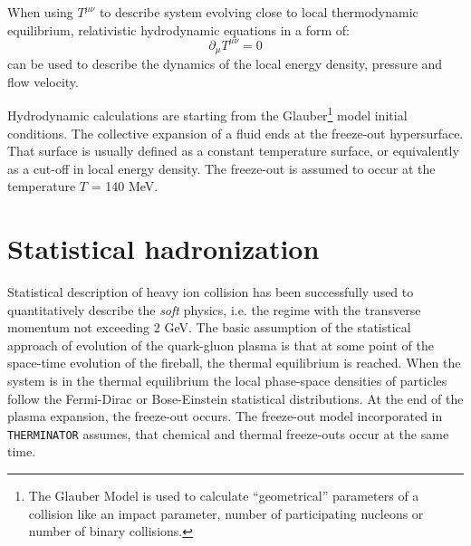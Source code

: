   When using $T^{\mu\nu}$ to describe system evolving close to local thermodynamic equilibrium, relativistic hydrodynamic equations in a form of:
  \begin{equation}
    \partial_{\mu} T^{\mu\nu} = 0
  \end{equation}
  can be used to describe the dynamics of the local energy density, pressure and flow velocity.

  Hydrodynamic calculations are starting from the Glauber\footnote{The Glauber Model is used to calculate ``geometrical'' parameters of a collision like an impact parameter, number of participating nucleons or number of binary collisions.}
  model initial conditions.
  The collective expansion of a fluid ends at the freeze-out hypersurface.
  That surface is usually defined as a constant temperature surface, or equivalently as a cut-off in local energy density.
  The freeze-out is assumed to occur at the temperature $T$ = 140 MeV.

  \section{Statistical hadronization}
    Statistical description of heavy ion collision has been successfully used to quantitatively describe the \textit{soft} physics, i.e. the regime with the transverse momentum not exceeding 2 GeV.
    The basic assumption of the statistical approach of evolution of the quark-gluon plasma is that at some point of the space-time evolution of the fireball, the thermal equilibrium is reached.
    When the system is in the thermal equilibrium the local phase-space densities of particles follow the Fermi-Dirac or Bose-Einstein statistical distributions.
    At the end of the plasma expansion, the freeze-out occurs.
    The freeze-out model incorporated in \verb|THERMINATOR| assumes, that chemical and thermal freeze-outs occur at the same time.
